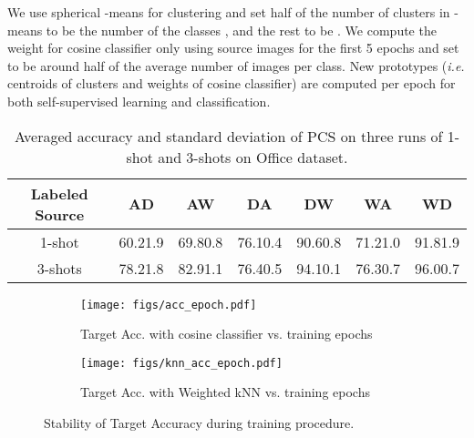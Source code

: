 \documentclass[final]{cvpr}
\begin{document}
We use spherical -means for clustering and set half of the number of clusters in -means to be the number of the classes , and the rest to be . We compute the weight for cosine classifier only using source images for the first 5 epochs and set  to be around half of the average number of images per class. New prototypes (\textit{i.e.} centroids of clusters and weights of cosine classifier) are computed per epoch for both self-supervised learning and classification. 















\begin{table*}[th]
\caption{Averaged accuracy and standard deviation of PCS on three runs of 1-shot and 3-shots on Office dataset.}
\centering
\begin{tabular}{@{}ccccccc@{}}
\toprule
Labeled Source & AD & AW & DA & DW & WA & WD \\ \midrule
1-shot & 60.21.9 & 69.80.8 & 76.10.4 & 90.60.8 & 71.21.0 & 91.81.9 \\
3-shots & 78.21.8 & 82.91.1 & 76.40.5 & 94.10.1 & 76.30.7 & 96.00.7 \\ \bottomrule
\end{tabular}
\label{tab:multirun}
\end{table*}

\begin{figure*}[t]
 \centering
 \hspace*{0.1cm}
 \begin{subfigure}{.5\textwidth}
    \centering
    \hspace*{-1cm}\texttt{[image: figs/acc\_epoch.pdf]}
    \caption{Target Acc. with cosine classifier vs. training epochs}
    \label{fig:accuracy_epoch:1}
 \end{subfigure}\begin{subfigure}{.5\textwidth}
    \centering
    \hspace*{-1cm}\texttt{[image: figs/knn\_acc\_epoch.pdf]}
    \caption{Target Acc. with Weighted kNN vs. training epochs}
    \label{fig:accuracy_epoch:2}
 \end{subfigure}\caption{Stability of Target Accuracy during training procedure. }
 \label{fig:accuracy_epoch}
\end{figure*}
\end{document}
